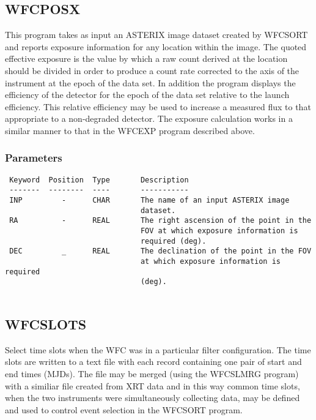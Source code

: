 \documentclass{book}
\renewcommand{\_}{{\tt\char'137}}     %
\begin{document}
\subsection{WFCPOSX}
This program takes as input an ASTERIX image dataset created by WFCSORT
and reports exposure information for any location within the image.
The quoted effective exposure is the value by which a raw count derived
at the location should be divided in order to produce a count rate
corrected to the axis of the instrument at the epoch of the data set.
In addition the program displays the efficiency of the detector for the
epoch of the data set relative to the launch efficiency. This relative
efficiency may be used to increase a measured flux to that appropriate
to a non-degraded detector. The exposure calculation works in a similar
manner to that in the WFCEXP program described above.
 
\subsubsection{Parameters}
\begin{verbatim}
 Keyword  Position  Type       Description
 -------  --------  ----       -----------
 INP         -      CHAR       The name of an input ASTERIX image
                               dataset.
 RA          -      REAL       The right ascension of the point in the
                               FOV at which exposure information is
                               required (deg).
 DEC         _      REAL       The declination of the point in the FOV
                               at which exposure information is required
                               (deg).
 
\end{verbatim}\subsection{WFCSLOTS}
Select time slots when the WFC was in a particular filter configuration.
The time slots are written to a text file with each record containing
one pair of start and end times (MJDs). The file may be merged (using
the WFCSLMRG program) with a similiar file created from XRT data and in
this way common time slots, when the two instruments were simultaneously
collecting data, may be defined and used to control event selection in
the WFCSORT program.
 
\end{document}
